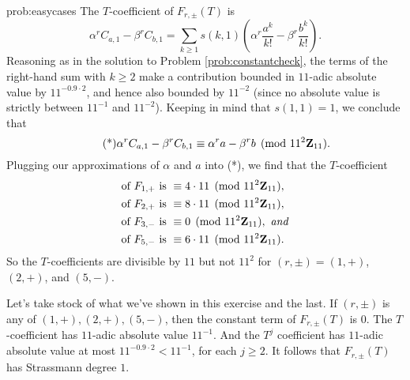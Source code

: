 \begin{sol}{prob:easycases} The $T$-coefficient of $F_{r,\pm}(T)$ is \[\alpha^r C_{a,1} - \beta^{r} C_{b,1} = \sum_{k\ge 1} s(k,1) \left(\alpha^r \frac{a^k}{k!} - \beta^r\frac{b^k}{k!}\right). \]
Reasoning as in the solution to Problem \ref{prob:constantcheck},  the terms of the right-hand sum with $k\ge 2$ make a contribution bounded in $11$-adic absolute value by $11^{-0.9\cdot 2}$, and hence also bounded by $11^{-2}$ (since no absolute value is strictly between $11^{-1}$ and $11^{-2}$). Keeping in mind that $s(1,1)=1$, we conclude that
\begin{equation}\tag{*} \alpha^r C_{a,1} - \beta^{r} C_{b,1} \equiv \alpha^r a - \beta^r b \pmod{11^2\mathbf{Z}_{11}}. \end{equation}
Plugging our approximations of $\alpha$ and $a$ into (*), we find that the $T$-coefficient
\begin{align*} \text{of $F_{1,+}$ is }&\equiv 4\cdot 11\pmod{11^2\mathbf{Z}_{11}}, \\
\text{of $F_{2,+}$ is }&\equiv 8\cdot 11\pmod{11^2\mathbf{Z}_{11}},\\
\text{of $F_{3,-}$ is }&\equiv 0 \pmod{11^2\mathbf{Z}_{11}}, \text{ \emph{and}}\\
\text{of $F_{5,-}$ is }&\equiv 6\cdot 11\pmod{11^2\mathbf{Z}_{11}}.
\end{align*}
So the $T$-coefficients are divisible by $11$ but not $11^2$ for $(r,\pm) = (1,+)$, $(2,+)$, and $(5,-)$.

Let's take stock of what we've shown in this exercise and the last. If $(r,\pm)$ is any of $(1,+), (2,+), (5,-)$, then the constant term of $F_{r,\pm}(T)$ is $0$. The $T$-coefficient has $11$-adic absolute value $11^{-1}$. And the $T^j$ coefficient has $11$-adic absolute value at most $11^{-0.9\cdot 2} < 11^{-1}$, for each $j\ge 2$. It follows that $F_{r,\pm}(T)$ has Strassmann degree $1$. 
\end{sol}

